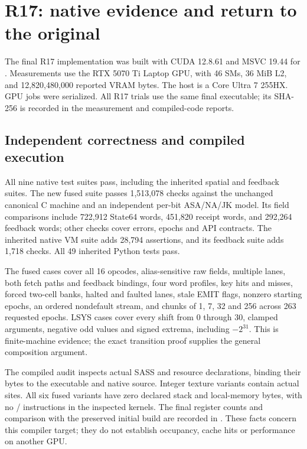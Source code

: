 \clearpage
\section{R17: native evidence and return to the original}
\label{sec:r17-evidence}

The final R17 implementation was built with CUDA 12.8.61 and MSVC 19.44
for . Measurements use the RTX 5070 Ti Laptop GPU, with
46 SMs, 36 MiB L2, and 12,820,480,000 reported VRAM bytes. The host is a
Core Ultra 7 255HX. GPU jobs were serialized. All R17 trials use the
same final executable; its SHA-256 is recorded in the measurement and
compiled-code reports.

\subsection{Independent correctness and compiled execution}

All nine native test suites pass, including the inherited spatial and
feedback suites. The new fused suite passes 1,513,078 checks against the
unchanged canonical C machine and an independent per-bit ASA/NA/JK model.
Its field comparisons include 722,912 State64 words, 451,820 receipt words,
and 292,264 feedback words; other checks cover errors, epochs and API
contracts. The inherited native VM suite adds 28,794 assertions, and its
feedback suite adds 1,718 checks. All 49 inherited Python tests pass.

The fused cases cover all 16 opcodes, alias-sensitive raw fields, multiple
lanes, both fetch paths and feedback bindings, four word profiles, key
hits and misses, forced two-cell banks, halted and faulted lanes, stale
EMIT flags, nonzero starting epochs, an ordered nondefault stream, and
chunks of 1, 7, 32 and 256 across 263 requested epochs. LSYS cases cover
every shift from 0 through 30, clamped arguments, negative odd values and
signed extrema, including $-2^{31}$. This is finite-machine evidence;
the exact transition proof supplies the general composition argument.

The compiled audit inspects actual SASS and resource declarations,
binding their bytes to the executable and native source. Integer texture
variants contain actual  sites. All six fused variants have
zero declared stack and local-memory bytes, with no /
instructions in the inspected kernels. The final register counts and
comparison with the preserved initial build are recorded in
. These facts concern this compiler target;
they do not establish occupancy, cache hits or performance on another GPU.

